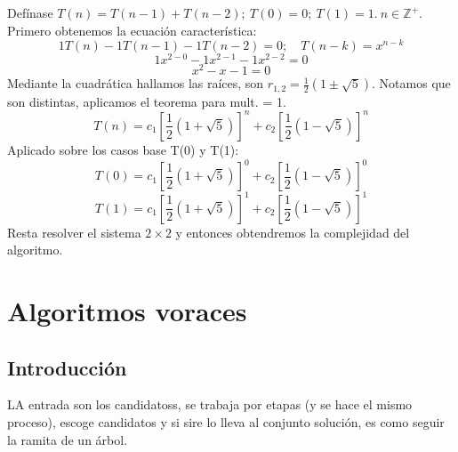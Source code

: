 \documentclass[tikz,11pt,fleqn]{book} %
\begin{document}
\begin{example}
    Defínase $T(n)=T(n-1)+T(n-2);~ T(0)=0;~ T(1)=1.~ n\in\mathbb{Z}^+$.\\
    Primero obtenemos la ecuación característica:
    $$ 1T(n)-1T(n-1)-1T(n-2)=0;\quad T(n-k)=x^{n-k} $$
    $$ 1x^{2-0}-1x^{2-1}-1x^{2-2}=0 $$
    $$ x^2-x-1=0 $$
        Mediante la cuadrática hallamos las raíces, son $r_{1,2}=\frac12(1\pm\sqrt5)$. Notamos que son distintas, aplicamos el teorema para mult. = 1.
        $$ T(n)=c_1[\frac12(1+\sqrt5)]^n+c_2[\frac12(1-\sqrt5)]^n $$
        Aplicado sobre los casos base T(0) y T(1):
        $$ T(0)=c_1[\frac12(1+\sqrt5)]^0+c_2[\frac12(1-\sqrt5)]^0 $$
        $$ T(1)=c_1[\frac12(1+\sqrt5)]^1+c_2[\frac12(1-\sqrt5)]^1 $$
        Resta resolver el sistema $2\times2$ y entonces obtendremos la complejidad del algoritmo.
\end{example}


\chapter{Algoritmos voraces}
\section{Introducción}
LA entrada son los candidatoss, se trabaja por etapas (y se hace el mismo proceso), escoge candidatos y si sire lo lleva al conjunto solución, es como seguir la ramita de un árbol.
\end{document}
